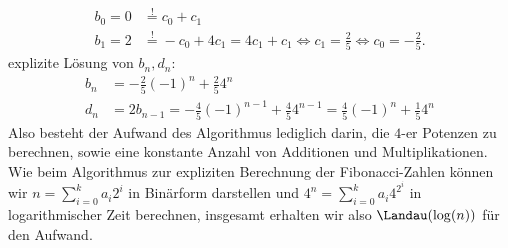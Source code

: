 \begin{solution}
\begin{enumerate}[label = \alph*)]
  \begin{align*}
    b_0 = 0 &\stackrel{!}{=} c_0 + c_1 \\
    b_1 = 2 &\stackrel{!}{=} -c_0 + 4c_1 = 4c_1 + c_1 \iff c_1 = \frac{2}{5} \iff c_0 = -\frac{2}{5}.
  \end{align*}
  explizite Lösung von $b_n,d_n$:
  \begin{align*}
    b_n &= -\frac{2}{5}(-1)^n + \frac{2}{5}4^n \\
    d_n &= 2b_{n-1} = -\frac{4}{5}(-1)^{n-1} + \frac{4}{5}4^{n-1} = \frac{4}{5}(-1)^n + \frac{1}{5}4^n
  \end{align*}
  Also besteht der Aufwand des Algorithmus lediglich darin, die $4$-er Potenzen
  zu berechnen, sowie eine konstante Anzahl von Additionen und Multiplikationen.
  Wie beim Algorithmus zur expliziten Berechnung der Fibonacci-Zahlen können
  wir $n = \sum_{i=0}^k a_i2^i$ in Binärform darstellen und $4^n = \sum_{i=0}^k a_i4^{2^i}$
  in logarithmischer Zeit berechnen, insgesamt erhalten wir also $\Landau(\log(n))$
  für den Aufwand. 
\end{enumerate}


\end{solution}

